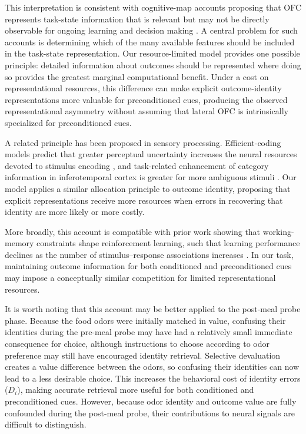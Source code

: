 \documentclass[12pt,letterpaper]{article}
\DeclareRobustCommand{\hl}{\textcolor{reviewtext}}
\begin{document}
This interpretation is consistent with cognitive-map accounts proposing that OFC represents task-state information that is relevant but may not be directly observable for ongoing learning and decision making \citep{wilson2014orbitofrontal,schuck2016human,niv2019learning}. A central problem for such accounts is determining which of the many available features should be included in the task-state representation. Our resource-limited model provides one possible principle: detailed information about outcomes should be represented where doing so provides the greatest marginal computational benefit. Under a cost on representational resources, this difference can make explicit outcome-identity representations more valuable for preconditioned cues, producing the observed representational asymmetry without assuming that lateral OFC is intrinsically specialized for preconditioned cues.

A related principle has been proposed in sensory processing. Efficient-coding models predict that greater perceptual uncertainty increases the neural resources devoted to stimulus encoding \citep{mlynarski2022efficient}, and task-related enhancement of category information in inferotemporal cortex is greater for more ambiguous stimuli \citep{dehaqani2022neural}. Our model applies a similar allocation principle to outcome identity, proposing that explicit representations receive more resources when errors in recovering that identity are more likely or more costly.

More broadly, this account is compatible with prior work showing that working-memory constraints shape reinforcement learning, such that learning performance declines as the number of stimulus–response associations increases \citep{collins2012much,collins2018tortoise}. In our task, maintaining outcome information for both conditioned and preconditioned cues may impose a conceptually similar competition for limited representational resources.

\hl{It is worth noting that this account may be better applied to the post-meal probe phase. Because the food odors were initially matched in value, confusing their identities during the pre-meal probe may have had a relatively small immediate consequence for choice, although instructions to choose according to odor preference may still have encouraged identity retrieval. Selective devaluation creates a value difference between the odors, so confusing their identities can now lead to a less desirable choice. This increases the behavioral cost of identity errors \mbox{($D_i$)}, making accurate retrieval more useful for both conditioned and preconditioned cues. However, because odor identity and outcome value are fully confounded during the post-meal probe, their contributions to neural signals are difficult to distinguish.}
\end{document}
